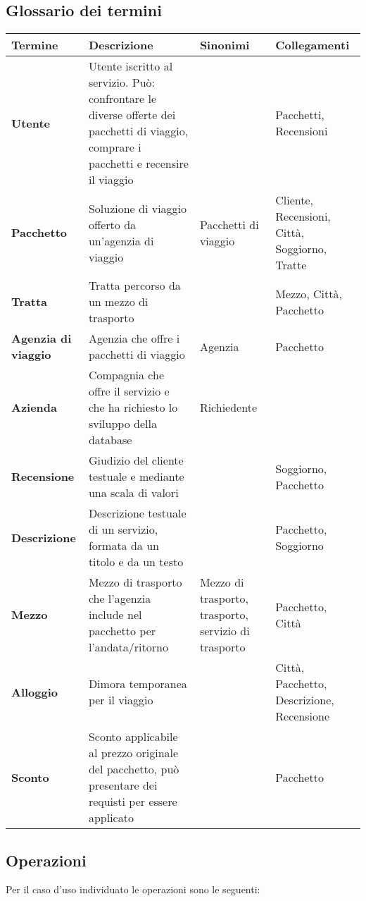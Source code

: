 \subsection{Glossario dei termini}
\begin{tabularx}{\textwidth}{p{} X p{} p{}}
    \toprule
    \textbf{Termine} & \textbf{Descrizione} & \textbf{Sinonimi} & \textbf{Collegamenti} \\
    \midrule
    \textbf{Utente} & Utente iscritto al servizio. Può: confrontare le diverse offerte dei pacchetti di viaggio, comprare i pacchetti e recensire il viaggio & & Pacchetti, Recensioni
    \\\midrule
    \textbf{Pacchetto} & Soluzione di viaggio offerto da un'agenzia di viaggio & Pacchetti di viaggio & Cliente, Recensioni, Città, Soggiorno, Tratte
    \\\midrule
    \textbf{Tratta} & Tratta percorso da un mezzo di trasporto & & Mezzo, Città, Pacchetto
    \\\midrule
    \textbf{Agenzia di viaggio} & Agenzia che offre i pacchetti di viaggio & Agenzia & Pacchetto
    \\\midrule
    \textbf{Azienda} & Compagnia che offre il servizio e che ha richiesto lo sviluppo della database & Richiedente &
    \\\midrule
    \textbf{Recensione} & Giudizio del cliente testuale e mediante una scala di valori & & Soggiorno, Pacchetto
    \\\midrule
    \textbf{Descrizione} & Descrizione testuale di un servizio, formata da un titolo e da un testo & & Pacchetto, Soggiorno
    \\\midrule
    \textbf{Mezzo} & Mezzo di trasporto che l'agenzia include nel pacchetto per l'andata/ritorno & Mezzo di trasporto, trasporto, servizio di trasporto & Pacchetto, Città
    \\\midrule
    \textbf{Alloggio} & Dimora temporanea per il viaggio & & Città, Pacchetto, Descrizione, Recensione
    \\\midrule
    \textbf{Sconto} & Sconto applicabile al prezzo originale del pacchetto, può presentare dei requisti per essere applicato & & Pacchetto
    \\
    \bottomrule
\end{tabularx}

\subsection{Operazioni}
Per il caso d'uso individuato le operazioni sono le seguenti:

